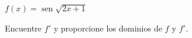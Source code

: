 \item $f(x) = \operatorname{sen} \sqrt{2x + 1}$
\par
Encuentre $f'$ y proporcione los dominios de $f$ y $f'$.
